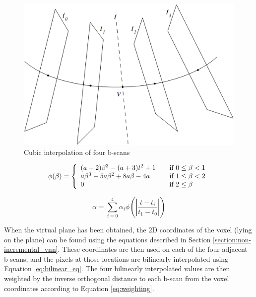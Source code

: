 	\begin{figure}[h]
	\centering
	\includegraphics[height=0.35\textheight]{graphics/cubic_interpolation.png}
	\caption{Cubic interpolation of four b-scans}
	\label{fig:cubic_interpolation}
	\end{figure}
	
	\begin{equation}
		\label{eq:key_function}
		\phi(\beta) = \left\{ 
			\begin{array}{l l}
				(a+2)\beta^3 - (a+3)t^2 + 1 			& \quad \mbox{if $0 \leq \beta < 1$} \\
				a\beta^3 - 5a\beta^2 + 8a\beta - 4a 	& \quad \mbox{if $1 \leq \beta < 2$} \\
				0 										& \quad \mbox{if $2 \leq \beta$} \\
			\end{array}
		\right.
	\end{equation}
	
	\begin{equation}
		\label{eq:cubic_interpolation}
		\alpha = \sum_{i=0}^{4}\alpha_i \phi(\left|\frac{t-t_i}{t_1-t_0}\right|)
	\end{equation}
	
	When the virtual plane has been obtained, the 2D coordinates of the voxel (lying on the plane) can be found using the equations described in Section \ref{section:non-incremental_vnn}. These coordinates are then used on each of the four adjacent b-scans, and the pixels at those locations are bilinearly interpolated using Equation \ref{eq:bilinear_eq}. The four bilinearly interpolated values are then weighted by the inverse orthogonal distance to each b-scan from the voxel coordinates according to Equation \ref{eq:weighting}.

